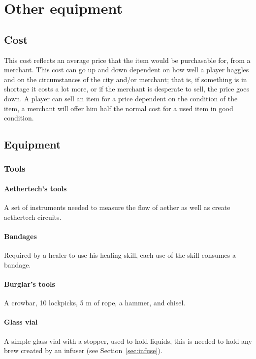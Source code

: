 \documentclass[a4paper,11pt,oneside]{book}
\begin{document}
\chapter{Other equipment}


\section{Cost}
This cost reflects an average price that the item would be purchasable for, from a merchant. This cost can go up and down dependent on how well a player haggles and on the circumstances of the city and/or merchant; that is, if something is in shortage it costs a lot more, or if the merchant is desperate to sell, the price goes down. A player can sell an item for a price dependent on the condition of the item, a merchant will offer him half the normal cost for a used item in good condition.

\section{Equipment}
\subsection{Tools}

\subsubsection{Aethertech's tools}
A set of instruments needed to measure the flow of aether as well as create aethertech circuits.

\subsubsection{Bandages}
Required by a healer to use his healing skill, each use of the skill consumes a bandage.

\subsubsection{Burglar's tools}
A crowbar, 10 lockpicks, 5 m of rope, a hammer, and chisel.

\subsubsection{Glass vial}
A simple glass vial with a stopper, used to hold liquids, this is needed to hold any brew created by an infuser (see Section~\ref{sec:infuse}).
\end{document}

